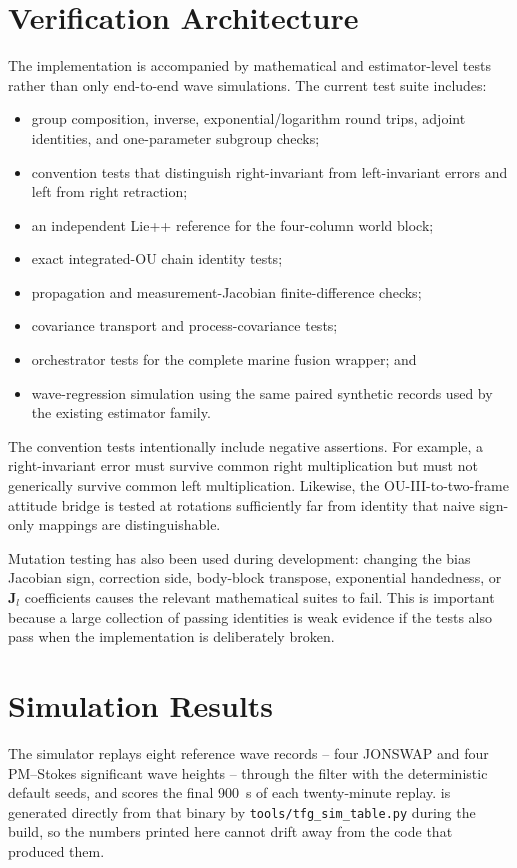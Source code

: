 \documentclass[conference]{IEEEtran}
\theoremstyle{bodysmall}
\begin{document}
\section{Verification Architecture}
The implementation is accompanied by mathematical and estimator-level tests rather than only end-to-end wave simulations. The current test suite includes:
\begin{itemize}[leftmargin=*]
\item group composition, inverse, exponential/logarithm round trips, adjoint identities, and one-parameter subgroup checks;
\item convention tests that distinguish right-invariant from left-invariant errors and left from right retraction;
\item an independent Lie++ reference for the four-column world block;
\item exact integrated-OU chain identity tests;
\item propagation and measurement-Jacobian finite-difference checks;
\item covariance transport and process-covariance tests;
\item orchestrator tests for the complete marine fusion wrapper; and
\item wave-regression simulation using the same paired synthetic records used by the existing estimator family.
\end{itemize}

The convention tests intentionally include negative assertions. For example, a right-invariant error must survive common right multiplication but must not generically survive common left multiplication. Likewise, the OU-III-to-two-frame attitude bridge is tested at rotations sufficiently far from identity that naive sign-only mappings are distinguishable.

Mutation testing has also been used during development: changing the bias Jacobian sign, correction side, body-block transpose, exponential handedness, or $\bm{J}_l$ coefficients causes the relevant mathematical suites to fail. This is important because a large collection of passing identities is weak evidence if the tests also pass when the implementation is deliberately broken.



\section{Simulation Results}
\label{sec:tfg-sim-results}
The simulator replays eight reference wave records -- four JONSWAP and four
PM--Stokes significant wave heights -- through the filter with the deterministic
default seeds, and scores the final \SI{900}{s} of each twenty-minute replay.
 is generated directly from that binary by
\texttt{tools/tfg\_sim\_table.py} during the build, so the numbers printed here
cannot drift away from the code that produced them.
\end{document}
